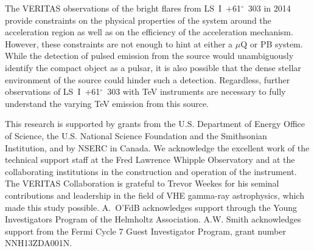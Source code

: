 \documentclass[preprint2]{aastex}
\newcommand{\lsi}{LS~I~+61$^{\circ}$~303}
\begin{document}

The VERITAS observations of the bright flares from \lsi{} in 2014 provide constraints on the physical properties of the system around the acceleration region as well as on the efficiency of the acceleration mechanism. However, these constraints are not enough to hint at either a $\mu$Q or PB system. While the detection of pulsed emission from the source would unambiguously identify the compact object as a pulsar, it is also possible that the dense stellar environment of the source could hinder such a detection. Regardless, further observations of \lsi{} with TeV instruments are necessary to fully understand the varying TeV emission from this source.
\vspace{2ex}

\small{
This research is supported by grants from the U.S. Department of Energy Office of Science, the U.S. National Science Foundation and the Smithsonian Institution, and by NSERC in Canada. We acknowledge the excellent work of the technical support staff at the Fred Lawrence Whipple Observatory and at the collaborating institutions in the construction and operation of the instrument. The VERITAS Collaboration is grateful to Trevor Weekes for his seminal contributions and leadership in the field of VHE gamma-ray astrophysics, which made this study possible. A.\ O'FdB acknowledges support through the Young Investigators Program of the Helmholtz Association. A.W. Smith acknowledges support from the Fermi Cycle 7 Guest Investigator Program, grant number NNH13ZDA001N.
}


\end{document}
